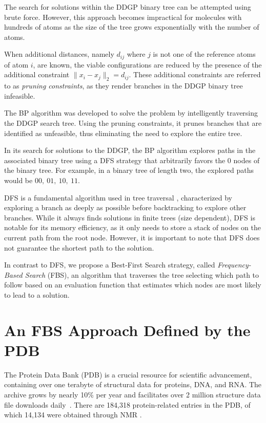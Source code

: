 \documentclass[journal=jacsat,manuscript=article]{achemso}
\begin{document}
The search for solutions within the DDGP binary tree can be attempted using brute force. However, this approach becomes impractical for molecules with {hundreds of atoms as the size} of the tree grows exponentially with the number of atoms.

When additional distances, namely \( d_{ij} \) where \( j \) is not one of the reference atoms of atom \( i \), are known, the viable configurations are reduced by the presence of the additional constraint \( \|x_i-x_j\|_2=d_{ij} \). These additional constraints are referred to as \emph{pruning constraints}, as they render branches in the DDGP binary tree infeasible. 

The BP algorithm was developed to solve the problem by intelligently {traversing} the DDGP search tree. Using the pruning constraints, it prunes branches that are identified as unfeasible, thus eliminating the need to explore the entire tree.

In its search for solutions to the DDGP, the BP algorithm explores paths in the associated binary tree using a DFS strategy that arbitrarily favors the \( 0 \) nodes of the binary tree. For example, in a binary tree of length two, the explored paths would be \( 00, \ 01, \ 10, \ 11 \).

DFS is a fundamental algorithm used in tree traversal \cite{cormen2022introduction}, characterized by exploring a branch as deeply as possible before backtracking to explore other branches. While it always finds solutions in finite trees (size dependent), DFS is notable for its memory efficiency, as it only needs to store a stack of nodes on the current path from the root node. However, it is important to note that DFS does not guarantee the shortest path to the solution.

In contrast to DFS, we propose a Best-First Search strategy, called \emph{Frequency-Based Search} (FBS), an algorithm that traverses the tree selecting which path to follow based on an evaluation function that estimates which nodes are most likely to lead to a solution.

\section{An FBS Approach Defined by the PDB}

The Protein Data Bank (PDB) is a crucial resource for scientific advancement, containing over {one} terabyte of structural data for proteins, DNA, and RNA. The archive grows by nearly 10\% per year and facilitates over 2 million structure data file downloads daily~\cite{RCSB23About}. There are 184,318 protein-related entries in the PDB, of which 14,134 were obtained through NMR \cite{RCSB23GrowthNMR}.
\end{document}
